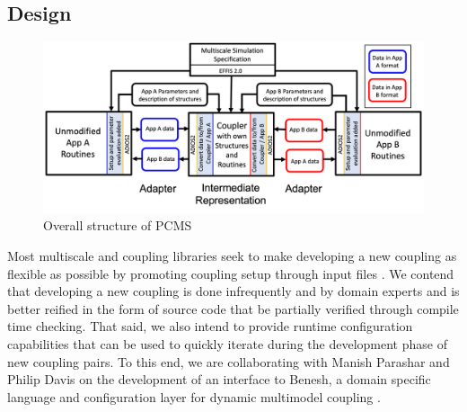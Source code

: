 \documentclass[12pt]{article}
\begin{document}
%

\subsection{Design}
\begin{figure}[ht]
    \centering
    \includegraphics[width=\textwidth]{figures/coupler.png}
    \caption{Overall structure of PCMS}
    \label{fig:PCMS structure}
\end{figure}
Most multiscale and coupling libraries seek to make developing a new coupling as flexible as possible by promoting coupling setup through input files \cite{chourdakisPreCICEV2Sustainable2022,tobinAdaptiveMultiscaleSimulation2018}. We contend that developing a new coupling is done infrequently and by domain experts and is better reified in the form of source code that be partially verified through compile time checking. That said, we also intend to provide runtime configuration capabilities that can be used to quickly iterate during the development phase of new coupling pairs. To this end, we are collaborating with Manish Parashar and Philip Davis on the development of an interface to Benesh, a domain specific language and configuration layer for dynamic multimodel coupling \cite{davisBeneshProgrammingModel2020}.
\end{document}
